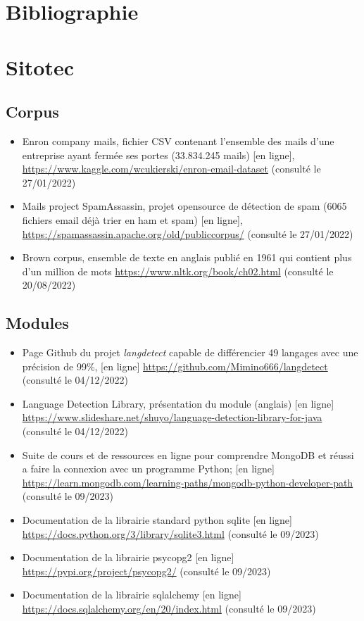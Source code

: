 \documentclass[a4paper,12pt]{article}
\begin{document}
	\section{Bibliographie}
		\label{sec:bibliographie}
		
		
	\newpage


	\section{Sitotec}
		\subsection{Corpus}
			\begin{itemize}
				\item Enron company mails, fichier CSV contenant l'ensemble des mails d'une entreprise ayant fermée ses portes (33.834.245 mails) [en ligne], \url{https://www.kaggle.com/wcukierski/enron-email-dataset} (consulté le 27/01/2022) \label{Enron_dataset}
				\item Mails project SpamAssassin, projet opensource de détection de spam (6065 fichiers email déjà trier en ham et spam) [en ligne], \url{https://spamassassin.apache.org/old/publiccorpus/} (consulté le 27/01/2022) \label{SpamAssassin_dataset}
				\item Brown corpus, ensemble de texte en anglais publié en 1961 qui contient plus d'un million de mots \url{https://www.nltk.org/book/ch02.html} (consulté le 20/08/2022) \label{Brown_corpus}
			\end{itemize}
		
		\subsection{Modules}
			\begin{itemize}
				\item Page Github du projet \emph{langdetect} capable de différencier 49 langages avec une précision de 99\%, [en ligne] \url{https://github.com/Mimino666/langdetect} (consulté le 04/12/2022) \label{langdetect}
				\item Language Detection Library, présentation du module (anglais) [en ligne] \url{https://www.slideshare.net/shuyo/language-detection-library-for-java} (consulté le 04/12/2022)
				\item Suite de cours et de ressources en ligne pour comprendre MongoDB et réussi a faire la connexion avec un programme Python; [en ligne] \url{https://learn.mongodb.com/learning-paths/mongodb-python-developer-path} (consulté le 09/2023)
				\item Documentation de la librairie standard python sqlite [en ligne] \url{https://docs.python.org/3/library/sqlite3.html} (consulté le 09/2023)
				\item Documentation de la librairie psycopg2 [en ligne] \url{https://pypi.org/project/psycopg2/} (consulté le 09/2023)
				\item Documentation de la librairie sqlalchemy [en ligne] \url{https://docs.sqlalchemy.org/en/20/index.html} (consulté le 09/2023)
			\end{itemize}
			
\end{document}
